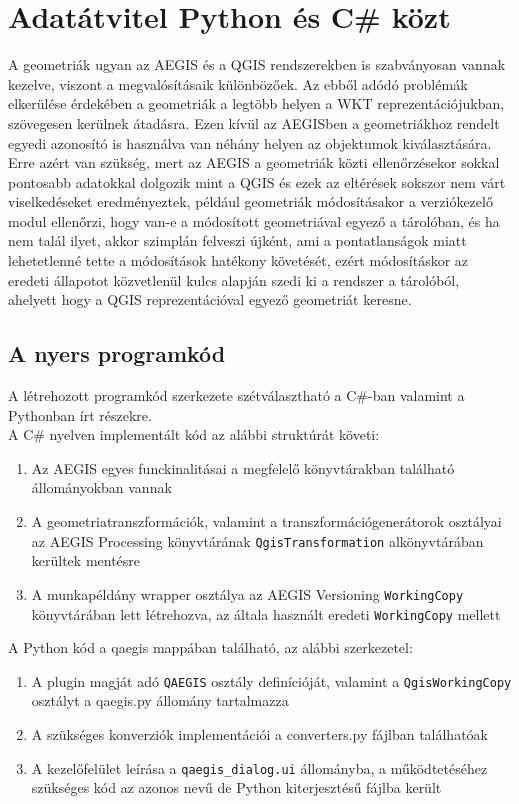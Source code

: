 \section{Adatátvitel Python és C\# közt}
A geometriák ugyan az AEGIS és a QGIS rendszerekben is szabványosan vannak kezelve, viszont a megvalósításaik különbözőek. Az ebből adódó problémák elkerülése érdekében a geometriák a legtöbb helyen a WKT reprezentációjukban, szövegesen kerülnek átadásra. Ezen kívül az AEGISben a geometriákhoz rendelt egyedi azonosító is használva van néhány helyen az objektumok kiválasztására. Erre azért van szükség, mert az AEGIS a geometriák közti ellenőrzésekor sokkal pontosabb adatokkal dolgozik mint a QGIS és ezek az eltérések sokszor nem várt viselkedéseket eredményeztek, például geometriák módosításakor a verziókezelő modul ellenőrzi, hogy van-e a módosított geometriával egyező a tárolóban, és ha nem talál ilyet, akkor szimplán felveszi újként, ami a pontatlanságok miatt lehetetlenné tette a módosítások hatékony követését, ezért módosításkor az eredeti állapotot közvetlenül kulcs alapján szedi ki a rendszer a tárolóból, ahelyett hogy a QGIS reprezentációval egyező geometriát keresne.


\subsection{A nyers programkód}
A létrehozott programkód szerkezete szétválasztható a C\#-ban valamint a Pythonban írt részekre.\\
A C\# nyelven implementált kód az alábbi struktúrát követi:
\begin{enumerate}
	\item Az AEGIS egyes funckinalitásai a megfelelő könyvtárakban található állományokban vannak
	\item A geometriatranszformációk, valamint a transzformációgenerátorok osztályai az AEGIS Processing könyvtárának \texttt{QgisTransformation} alkönyvtárában kerültek mentésre
	\item A munkapéldány wrapper osztálya az AEGIS Versioning \texttt{WorkingCopy} könyvtárában lett létrehozva, az általa használt eredeti \texttt{WorkingCopy} mellett 
\end{enumerate}
A Python kód a qaegis mappában található, az alábbi szerkezetel:
\begin{enumerate}
	\item A plugin magját adó \texttt{QAEGIS} osztály definícióját, valamint a \texttt{QgisWorkingCopy} osztályt a qaegis.py állomány tartalmazza
	\item A szükséges konverziók implementációi a converters.py fájlban találhatóak
	\item A kezelőfelület leírása a \texttt{qaegis\_dialog.ui} állományba, a működtetéséhez szükséges kód az azonos nevű de Python kiterjesztésű fájlba került
\end{enumerate}
